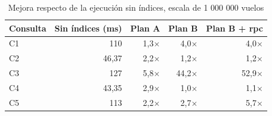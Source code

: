 \begin{table}[H]
\centering
\small
\caption{Mejora respecto de la ejecución sin índices, escala de 1 000 000 vuelos}
\label{tab:mejora}
\begin{tabular}{lrrrr}
\toprule
Consulta & Sin índices (ms) & Plan A & Plan B & Plan B + rpc \\
\midrule
C1 & 110 & 1,3$\times$ & 4,0$\times$ & 4,0$\times$ \\
C2 & 46,37 & 2,2$\times$ & 1,2$\times$ & 1,2$\times$ \\
C3 & 127 & 5,8$\times$ & 44,2$\times$ & 52,9$\times$ \\
C4 & 43,35 & 2,9$\times$ & 1,0$\times$ & 1,1$\times$ \\
C5 & 113 & 2,2$\times$ & 2,7$\times$ & 5,7$\times$ \\
\bottomrule
\end{tabular}
\end{table}
